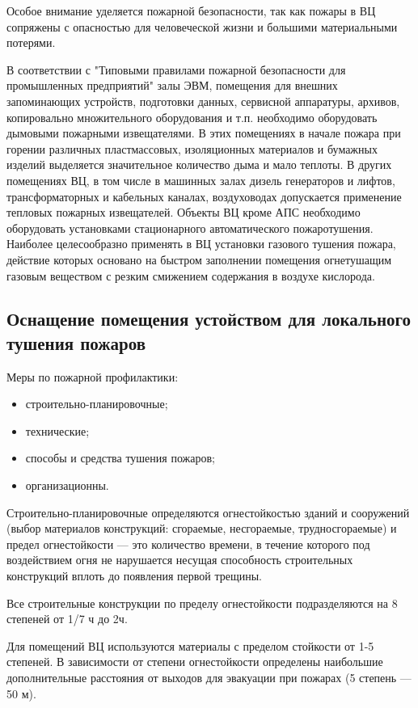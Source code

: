 Особое внимание уделяется пожарной безопасности, так как пожары в ВЦ сопряжены с опасностью для человеческой
жизни и большими материальными потерями.

В соответствии с "Типовыми правилами пожарной безопасности для промышленных предприятий" залы ЭВМ, помещения
для внешних запоминающих устройств, подготовки данных, сервисной аппаратуры, архивов, копировально множительного
оборудования и т.п. необходимо оборудовать дымовыми пожарными извещателями. В этих помещениях в начале пожара
при горении различных пластмассовых, изоляционных материалов и бумажных изделий выделяется значительное количество
дыма и мало теплоты. В других помещениях ВЦ, в том числе в машинных залах дизель генераторов и лифтов, трансформаторных
и кабельных каналах, воздуховодах допускается применение тепловых пожарных извещателей. Объекты ВЦ кроме АПС необходимо
оборудовать установками стационарного автоматического пожаротушения. Наиболее целесообразно применять в ВЦ установки
газового тушения пожара, действие которых основано на быстром заполнении помещения огнетушащим газовым веществом с
резким смижением содержания в воздухе кислорода.

\subsection{Оснащение помещения устойством для локального тушения пожаров}

Меры по пожарной профилактики:
\begin{itemize}
\item строительно-планировочные;
\item технические;
\item способы и средства тушения пожаров;
\item организационны.
\end{itemize}

Строительно-планировочные определяются огнестойкостью зданий и сооружений (выбор материалов конструкций: сгораемые, несгораемые,
трудносгораемые) и предел огнестойкости — это количество времени, в течение которого под воздействием огня не нарушается
несущая способность строительных конструкций вплоть до появления первой трещины.

Все строительные конструкции по пределу огнестойкости подразделяются на 8 степеней от 1/7 ч до 2ч.

Для помещений ВЦ используются материалы с пределом стойкости от 1-5 степеней. В зависимости от степени огнестойкости определены
наибольшие дополнительные расстояния от выходов для эвакуации при пожарах (5 степень — 50 м).

